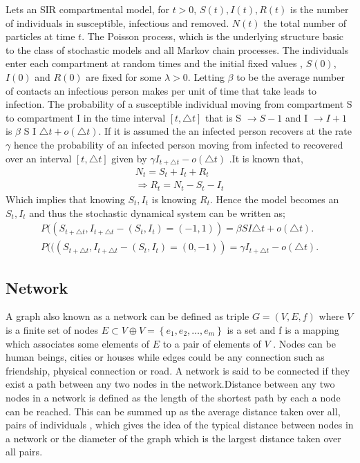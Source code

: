  Lets an SIR compartmental model, for $t > 0$, $S(t),I(t),R(t)$ is the number of individuals in susceptible, infectious and removed. $N(t)$ the total number of particles at time $t$. The Poisson process, which is the underlying structure basic to the class of stochastic models and all Markov chain processes\citep{greenwood2009stochastic}. The individuals enter each compartment at random times and the initial fixed values , $S(0)$,$I(0)$ and $R(0)$ are fixed for some $\lambda > 0$. Letting $\beta$ to be the average number of  contacts an infectious person makes per unit of time that take leads to infection. The probability of a susceptible individual moving from compartment S to compartment I in the time interval $\left[ t,\triangle t \right]$ that is  S $\rightarrow S-1$ and I $\rightarrow I + 1 $ is $ \beta$ S I $ \triangle t + o (\triangle t)$. If it is assumed the an infected person recovers at the rate $\gamma$ hence the probability of an infected person moving from infected to recovered over an interval $\left[ t,\triangle t \right]$  given by $\gamma I_{t + \triangle t} -o (\triangle t)$ .It is known that,
 \begin{align*}
 N_t = S_t + I_t + R_t
 \\ \Rightarrow  R_t = N_t - S_t - I_t
\end{align*}  
Which implies that knowing $S_t,I_t$ is knowing $R_t$. Hence the model becomes an $S_t,I_t$ and thus the stochastic dynamical system can be written as;
 \begin{align}
 P((S_{t + \triangle t}, I_{t + \triangle t} - (S_t ,I_t) = ( - 1,1)) =  \beta S I  \triangle t + o (\triangle t).
 \\ P (((S_{t + \triangle t}, I_{t + \triangle t} - (S_t ,I_t) = ( 0,-1)) = \gamma I_{t + \triangle t} -o (\triangle t).
 \end{align}
\subsection{Network}


 A graph also known as a network   can be  defined as triple $G = (V,E,f)$ where $V$ is a finite set of nodes $E \subset V \oplus V = \left\lbrace e_1,e_2,\dots ,e_m \right\rbrace$ is a set and f is a mapping which associates some elements of $E$ to a pair of elements of $V$ \citep{estrada2012structure}. Nodes can be human beings, cities or houses while edges could be any connection such as friendship, physical connection or road.
 A network is said to be connected if they exist a path between any two nodes in the network.Distance between any two nodes in a network is defined as the length of the shortest path by each a node can be reached. This can be summed up as the average distance taken over all, pairs of individuals , which gives the idea of the typical distance between nodes in a network or the diameter of the graph which is the largest distance taken over all pairs.
